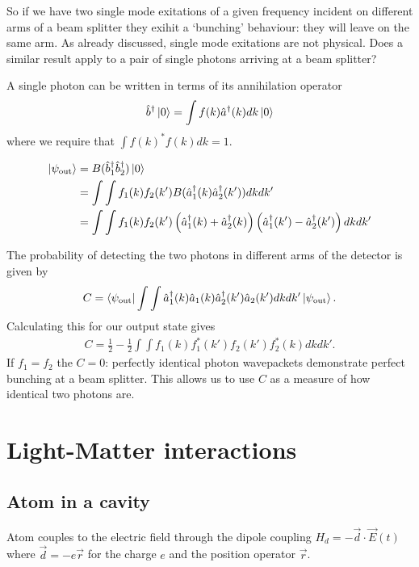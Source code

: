 So if we have two single mode exitations of a given frequency incident on different arms of a beam splitter they exihit a `bunching' behaviour: they will leave on the same arm. As already discussed, single mode exitations are not physical. Does a similar result apply to a pair of single photons arriving at a beam splitter?

A single photon can be written in terms of its annihilation operator
\begin{align}
  \hat{b}^\dagger\left\vert0\right\rangle = \int f(k) \hat{a}^\dagger(k) dk\left\vert0\right\rangle
\end{align}
where we require that $\int f(k)^* f(k) dk = 1$.

\begin{align}
  \left\vert\psi_\text{out}\right\rangle &= B(\hat{b}^\dagger_1 \hat{b}^\dagger_2)\left\vert0\right\rangle\\
  & = \int \int f_1(k)f_2(k') B(\hat{a}^\dagger_1(k) \hat{a}^\dagger_2(k')) dkdk' \\
  & = \int \int f_1(k)f_2(k') \left(\hat{a}^\dagger_{1}(k) + \hat{a}^\dagger_{2}(k)\right) \left(\hat{a}^\dagger_{1}(k') - \hat{a}^\dagger_{2}(k')\right)  dkdk' \\
\end{align}

The probability of detecting the two photons in different arms of the detector is given by
\begin{align}
  C = \left\langle \psi_\text{out}\right\vert \int\int \hat{a}^\dagger_1(k)\hat{a}_1(k) \hat{a}^\dagger_2(k')\hat{a}_2(k') dk dk'\left\vert\psi_\text{out}\right\rangle.
\end{align}
Calculating this for our output state gives
\begin{align}
  C = \frac{1}{2} - \frac{1}{2}\int\int f_1(k)f_1^*(k')f_2(k')f_2^*(k) dk dk'.
\end{align}
If $f_1 = f_2$ the $C=0$: perfectly identical photon wavepackets demonstrate perfect bunching at a beam splitter. This allows us to use $C$ as a measure of how identical two photons are.

\section{Light-Matter interactions}

\subsection{Atom in a cavity}

Atom couples to the electric field through the dipole coupling $H_d = -\vec{d}\cdot\vec{E}(t)$ where $\vec{d} = -e \vec{r}$ for the charge $e$ and the position operator $\vec{r}$.

